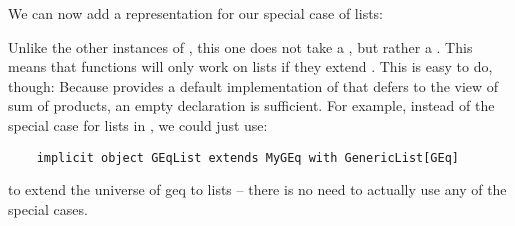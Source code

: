 We can now add a representation for our special case of lists:



Unlike the other instances of , this one does not take a ,
but rather a . This means that functions will only work on
lists if they extend . This is easy to do, though: Because
 provides a default implementation of  that defers to
the view of sum of products, an empty declaration is sufficient. For example,
instead of the special case for lists in , we could just use:
\begin{lstlisting}
    implicit object GEqList extends MyGEq with GenericList[GEq]
\end{lstlisting}
to extend the universe of geq to lists -- there is no need to actually use any
of the special cases.
